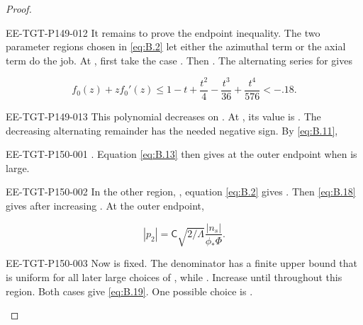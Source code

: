 \begin{proof}
\begin{EESegment}{EE-TGT-P149-012}
It remains to prove the endpoint inequality. The two parameter regions chosen in \eqref{eq:B.2}
let either the azimuthal term or the axial term do the job. At , first take
the case . Then . The
alternating series for  gives
\end{EESegment}
\begin{equation*}
  f_0(z)+zf_0'(z)\leq1-t+\frac{t^2}{4}-\frac{t^3}{36}+\frac{t^4}{576}<-.18.
\end{equation*}
\begin{EESegment}{EE-TGT-P149-013}
This polynomial decreases on . At
, its value is
. The decreasing alternating remainder has the
needed negative sign. By \eqref{eq:B.11},
\end{EESegment}
%
\begin{EESegment}{EE-TGT-P150-001}
. Equation \eqref{eq:B.13} then gives
 at the outer endpoint when
 is large.
\end{EESegment}

\begin{EESegment}{EE-TGT-P150-002}
In the other region, , equation \eqref{eq:B.2} gives
. Then \eqref{eq:B.18} gives
 after increasing
. At the outer endpoint,
\end{EESegment}
\begin{equation*}
  |p_2|=\mathsf C\sqrt{2/\Lambda}\frac{|n_s|}{\phi_*\Phi}.
\end{equation*}
\begin{EESegment}{EE-TGT-P150-003}
Now  is fixed. The denominator has a finite upper bound that is
uniform for all later large choices of , while
. Increase  until
 throughout this region. Both cases give \eqref{eq:B.19}. One
possible choice is .
\end{EESegment}
\end{proof}


